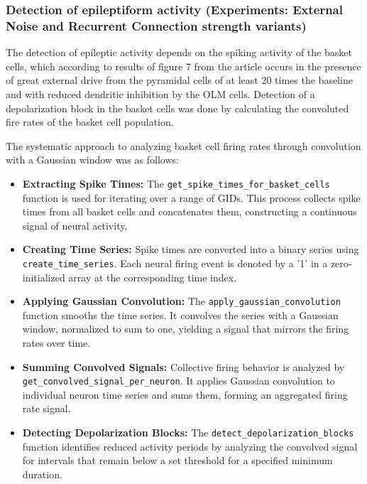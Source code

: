 \subsubsection{Detection of epileptiform activity (Experiments: External Noise and Recurrent Connection strength variants)}
The detection of epileptic activity depends on the spiking activity of the
basket cells, which according to results of figure 7 from the
\textcite{sanjayImpairedDendriticInhibition2015} article occurs in the presence
of great external drive from the pyramidal cells of at least 20 times the
baseline and with reduced dendritic inhibition by the OLM cells. Detection of a
depolarization block in the basket cells was done by calculating the convoluted
fire rates of the basket cell population.


\noindent The systematic approach to analyzing basket cell firing rates through convolution with a Gaussian window was as follows:
\begin{itemize}
    \item \textbf{Extracting Spike Times:} The \lstinline{get_spike_times_for_basket_cells}
          function is used for iterating over a range of GIDs. This process collects spike times from
          all basket cells and concatenates them, constructing a continuous signal of neural activity.

    \item \textbf{Creating Time Series:} Spike times are converted into a binary series
          using \lstinline{create_time_series}. Each neural firing event is denoted by a '1' in a
          zero-initialized array at the corresponding time index.

    \item \textbf{Applying Gaussian Convolution:} The \lstinline{apply_gaussian_convolution}\newline
          function smooths the time series. It convolves the series with a Gaussian window, normalized
          to sum to one, yielding a signal that mirrors the firing rates over time.

    \item \textbf{Summing Convolved Signals:} Collective firing behavior is analyzed by
          \lstinline{get_convolved_signal_per_neuron}. It applies Gaussian convolution to individual
          neuron time series and sums them, forming an aggregated firing rate signal.

    \item \textbf{Detecting Depolarization Blocks:} The \lstinline{detect_depolarization_blocks}
          function identifies reduced activity periods by analyzing the convolved signal for intervals
          that remain below a set threshold for a specified minimum duration.
\end{itemize}

